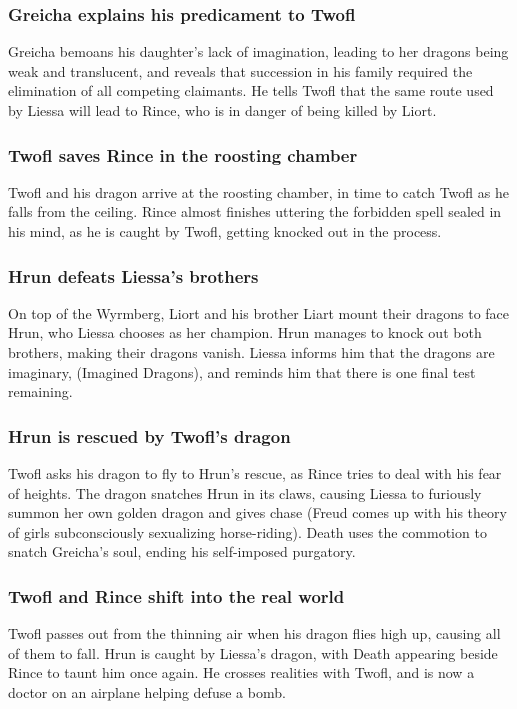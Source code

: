 \subsubsection{\Gls{Greicha} explains his predicament to \Gls{Twofl}}
\Gls{Greicha} bemoans his daughter's lack of imagination, leading to her dragons being weak and
translucent, and reveals that succession in his family required the elimination of all competing
claimants. He tells \Gls{Twofl} that the same route used by \Gls{Liessa} will lead to \Gls{Rince},
who is in danger of being killed by \Gls{Liort}.

\subsubsection{\Gls{Twofl} saves \Gls{Rince} in the roosting chamber}
\Gls{Twofl} and his dragon arrive at the roosting chamber, in time to catch \Gls{Twofl} as he
falls from the ceiling. \Gls{Rince} almost finishes uttering the forbidden spell sealed in his mind,
as he is caught by \Gls{Twofl}, getting knocked out in the process.

\subsubsection{\Gls{Hrun} defeats \Gls{Liessa}'s brothers}
On top of the Wyrmberg, \Gls{Liort} and his brother \Gls{Liart} mount their dragons to face
\Gls{Hrun}, who \Gls{Liessa} chooses as her champion. \Gls{Hrun} manages to knock out both brothers,
making their dragons vanish. \Gls{Liessa} informs him that the dragons are imaginary, (Imagined
Dragons), and reminds him that there is one final test remaining.

\subsubsection{\Gls{Hrun} is rescued by \Gls{Twofl}'s dragon}
\Gls{Twofl} asks his dragon to fly to \Gls{Hrun}'s rescue, as \Gls{Rince} tries to deal with his
fear of heights. The dragon snatches \Gls{Hrun} in its claws, causing \Gls{Liessa} to furiously
summon her own golden dragon and gives chase (Freud comes up with his theory of girls subconsciously
sexualizing horse-riding). \Gls{Death} uses the commotion to snatch \Gls{Greicha}'s soul, ending
his self-imposed purgatory.

\subsubsection{\Gls{Twofl} and \Gls{Rince} shift into the real world}
\Gls{Twofl} passes out from the thinning air when his dragon flies high up, causing all of them
to fall. \Gls{Hrun} is caught by \Gls{Liessa}'s dragon, with \Gls{Death} appearing beside
\Gls{Rince} to taunt him once again. He crosses realities with \Gls{Twofl}, and is now a doctor on
an airplane helping defuse a bomb.

